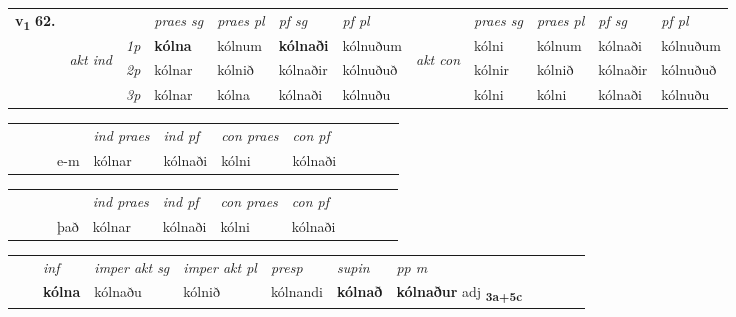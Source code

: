 \begin{tabular}{llllllllllll} \toprule
\multirow{4}{*}{{{\textbf{v{\textsubscript{1}}} \Large{\textbf{62.}}}}}  & &   &  \textit{praes sg}  & \textit{praes pl}  &\textit{ pf sg} & \textit{pf pl} &  &  \textit{praes sg}  & \textit{praes pl}  & \textit{pf sg} & \textit{pf pl } \\*
	\cmidrule{4-7} \cmidrule{9-12}
 & \multirow{3}{*}{\begin{turn}{90}\textit{akt ind}\end{turn}} & {\textit{1p}} & \textbf{kólna} & kólnum    & \textbf{kólnaði} & kólnuðum & \multirow{3}{*}{\begin{turn}{90}\textit{akt con}\end{turn}} &kólni & kólnum & kólnaði & kólnuðum\\*
& &  {\textit{2p}} &  kólnar  & kólnið   & kólnaðir & kólnuðuð & & kólnir & kólnið & kólnaðir & kólnuðuð \\*
& &  {\textit{3p}} & kólnar & kólna   & kólnaði & kólnuðu & & kólni & kólni& kólnaði & kólnuðu  \\*
\cmidrule{4-7} \cmidrule{9-12}
\end{tabular}


\begin{tabular}{llllllllllll}
 & &  & &  \textit{ind praes} & \textit{ind pf} & \textit{con praes} & \textit{con pf} \\*
&  & & e-m & kólnar & kólnaði & kólni & kólnaði \\*
\cmidrule{5-9}
\end{tabular}


\begin{tabular}{llllllllllll}
 & &  & &  \textit{ind praes} & \textit{ind pf} & \textit{con praes} & \textit{con pf} \\*
&  & & það & kólnar & kólnaði & kólni & kólnaði \\*
\cmidrule{5-9}
\end{tabular}


\begin{tabular}{llllllllllll}
 & & \textit{inf} & \textit{imper akt sg} & \textit{imper akt pl}   & \textit{presp} & \textit{supin}  & \textit{pp m}     \\*
  & & \textbf{kólna} & kólnaðu  & kólnið   & kólnandi &  \textbf{kólnað}  & \textbf{kólnaður} adj \textbf{\textsubscript{3a+5c}} \\*
\cmidrule{1-12}
\end{tabular}



